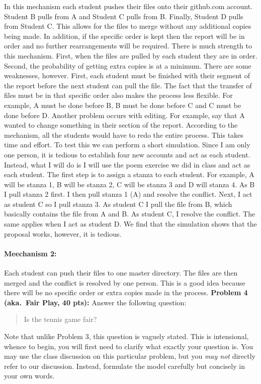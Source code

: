 \documentclass[12pt]{article}
\begin{document}
 In this mechanism each student pushes their files onto their github.com account. Student B pulls from A and Student C pulls from B. Finally, Student D pulls from Student C. This allows for the files to merge without any additional copies being made. In addition, if the specific order is kept then the report will be in order and no further rearrangements will be required. 
\newline
There is much strength to this mechanism. First, when the files are pulled by each student they are in order. Second, the probability of getting extra copies is at a minimum. There are some weaknesses, however. First, each student must be finished with their segment of the report before the next student can pull the file. The fact that the transfer of files must be in that specific order also makes the process less flexible. For example, A must be done before B, B must be done before C and C must be done before D. Another problem occurs with editing. For example, say that A wanted to change something in their section of the report. According to the mechanism, all the students would have to redo the entire process. This takes time and effort.
\newline
To test this we can perform a short simulation. Since I am only one person, it is tedious to establish four new accounts and act as each student. Instead, what I will do is I will use the poem exercise we did in class and act as each student. The first step is to assign a stanza to each student. For example, A will be stanza 1, B will be stanza 2, C will be stanza 3 and D will stanza 4. As B I pull stanza 2 first. I then pull stanza 1 (A) and resolve the conflict. Next, I act as student C so I pull stanza 3. As student C I pull the file from B, which basically contains the file from A and B. As student C, I resolve the conflict. The same applies when I act as student D. We find that the simulation shows that the proposal works, however, it is tedious. 
 

\paragraph {Meechanism 2: }
Each student can push their files to one master directory. The files are then merged and the conflict is resolved by one person. This is a good idea because there will be no specific order or extra copies made in the process. 
\vskip0.25in
\noindent\textbf{Problem 4 (aka.\ Fair Play, 40 pts):}
Answer the following question:
\begin{verse}
Is the tennis game fair?
\end{verse}
Note that unlike Problem 3, this question is vaguely stated.
This is intensional, whence to begin, you will first need to clarify
what exactly your question is.
You may use the class discussion on this particular 
problem, but you \emph{may not} directly refer to our 
discussion.  Instead, formulate the model carefully but concisely in 
your own words.   
\end{document}
